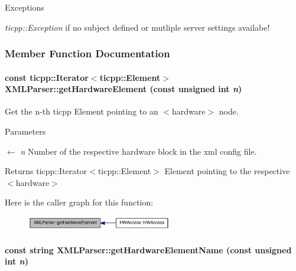 \begin{DoxyExceptions}{Exceptions}
\item[{\em ticpp::Exception}]if no subject defined or mutliple server settings availabe! \end{DoxyExceptions}


\subsubsection{Member Function Documentation}
\hypertarget{class_x_m_l_parser_a47c7597267f5efbf1b91c9c5167e60da}{
\paragraph[{getHardwareElement}]{\setlength{\rightskip}{0pt plus 5cm}const ticpp::Iterator$<$ticpp::Element$>$ XMLParser::getHardwareElement (const unsigned int {\em n})}\hfill}
\label{class_x_m_l_parser_a47c7597267f5efbf1b91c9c5167e60da}


Get the n-\/th ticpp Element pointing to an $<$hardware$>$ node. 
\begin{DoxyParams}{Parameters}
\item[\mbox{$\leftarrow$} {\em n}]Number of the respective hardware block in the xml config file. \end{DoxyParams}
\begin{DoxyReturn}{Returns}
ticpp::Iterator$<$ticpp::Element$>$ Element pointing to the respective $<$hardware$>$ 
\end{DoxyReturn}


Here is the caller graph for this function:\nopagebreak
\begin{figure}[H]
\begin{center}
\leavevmode
\includegraphics[width=179pt]{class_x_m_l_parser_a47c7597267f5efbf1b91c9c5167e60da_icgraph}
\end{center}
\end{figure}
\hypertarget{class_x_m_l_parser_a94e96b54de258081ab16e2d91e690e22}{
\paragraph[{getHardwareElementName}]{\setlength{\rightskip}{0pt plus 5cm}const string XMLParser::getHardwareElementName (const unsigned int {\em n})}\hfill}
\label{class_x_m_l_parser_a94e96b54de258081ab16e2d91e690e22}


